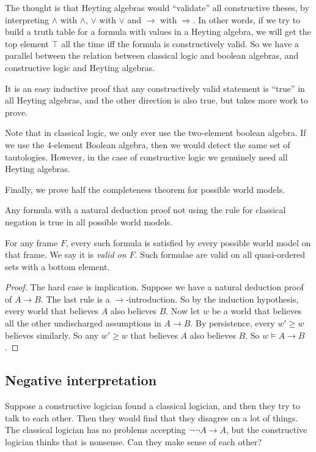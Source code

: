 \documentclass[a4paper]{article}
\begin{document}
The thought is that Heyting algebras would ``validate'' all constructive theses, by interpreting $\wedge$ with $\wedge$, $\vee$ with $\vee$ and $\rightarrow$ with $\Rightarrow$. In other words, if we try to build a truth table for a formula with values in a Heyting algebra, we will get the top element $\top$ all the time iff the formula is constructively valid. So we have a parallel between the relation between classical logic and boolean algebras, and constructive logic and Heyting algebras.

It is an easy inductive proof that any constructively valid statement is ``true'' in all Heyting algebras, and the other direction is also true, but takes more work to prove.

Note that in classical logic, we only ever use the two-element boolean algebra. If we use the 4-element Boolean algebra, then we would detect the same set of tautologies. However, in the case of constructive logic we genuinely need all Heyting algebras.

Finally, we prove half the completeness theorem for possible world models.
\begin{lemma}
  Any formula with a natural deduction proof not using the rule for classical negation is true in all possible world models.
\end{lemma}
For any frame $F$, every such formula is satisfied by every possible world model on that frame. We say it is \emph{valid on $F$}. Such formulae are valid on all quasi-ordered sets with a bottom element.

\begin{proof}
  The hard case is implication. Suppose we have a natural deduction proof of $A \to B$. The last rule is a $\to$-introduction. So by the induction hypothesis, every world that believes $A$ also believes $B$. Now let $w$ be a world that believes all the other undischarged assumptions in $A \to B$. By persistence, every $w' \geq w$ believes similarly. So any $w' \geq w$ that believes $A$ also believes $B$. So $w \vDash A \to B$.
\end{proof}


\subsection{Negative interpretation}
Suppose a constructive logician found a classical logician, and then they try to talk to each other. Then they would find that they disagree on a lot of things. The classical logician has no problems accepting $\neg \neg A \to A$, but the constructive logician thinks that is nonsense. Can they make sense of each other?
\end{document}
